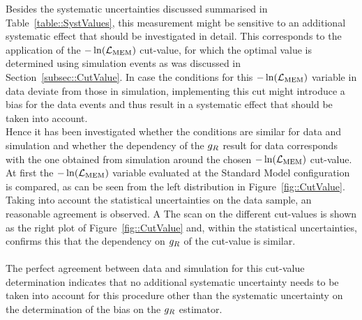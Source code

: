 Besides the systematic uncertainties discussed summarised in Table~\ref{table::SystValues}, this measurement might be sensitive to an additional systematic effect that should be investigated in detail.
This corresponds to the application of the $-\ln(\mathcal{L}_{\textrm{MEM}})$ cut-value, for which the optimal value is determined using simulation events as was discussed in Section~\ref{subsec::CutValue}.
In case the conditions for this $-\ln(\mathcal{L}_{\textrm{MEM}})$ variable in data deviate from those in simulation, implementing this cut might introduce a bias for the data events and thus result in a systematic effect that should be taken into account.
\\
Hence it has been investigated whether the conditions are similar for data and simulation and whether the dependency of the $g_{R}$ result for data corresponds with the one obtained from simulation around the chosen $-\ln(\mathcal{L}_{\textrm{MEM}})$ cut-value.
At first the $-\ln(\mathcal{L}_{\textrm{MEM}})$ variable evaluated at the Standard Model configuration is compared, as can be seen from the left distribution in Figure~\ref{fig::CutValue}.
Taking into account the statistical uncertainties on the data sample, an reasonable agreement is observed. 
A%
The scan on the different cut-values is shown as the right plot of Figure~\ref{fig::CutValue} and, within the statistical uncertainties, confirms this that the dependency on $g_{R}$ of the cut-value is similar.
\\
\\
The perfect agreement between data and simulation for this cut-value determination indicates that no additional systematic uncertainty needs to be taken into account for this procedure other than the systematic uncertainty on the determination of the bias on the $g_{R}$ estimator.
